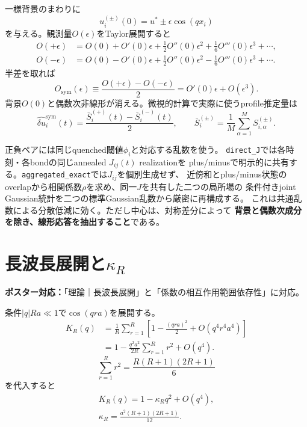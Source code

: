\documentclass[a4paper,12pt]{ltjsarticle}
\newcommand{\PosterMap}[1]{%
  \begin{tcolorbox}[enhanced,boxrule=0pt,arc=1mm,colback=softgray,
    left=2mm,right=2mm,top=1mm,bottom=1mm,before skip=0pt,after skip=0.7em]
  \normalsize\textbf{ポスター対応：}#1
  \end{tcolorbox}}
\begin{document}
一様背景のまわりに
\begin{equation}
 u_i^{(\pm)}(0)=u^*\pm\epsilon\cos(qx_i)
 \label{eq:paired-initial}
\end{equation}
を与える。観測量$O(\epsilon)$をTaylor展開すると
\begin{align}
 O(+\epsilon)&=O(0)+O'(0)\epsilon+\frac12O''(0)\epsilon^2
 +\frac16O'''(0)\epsilon^3+\cdots,\\
 O(-\epsilon)&=O(0)-O'(0)\epsilon+\frac12O''(0)\epsilon^2
 -\frac16O'''(0)\epsilon^3+\cdots.
\end{align}
半差を取れば
\begin{equation}
 \boxed{O_{\mathrm{sym}}(\epsilon)
 \equiv\frac{O(+\epsilon)-O(-\epsilon)}2
 =O'(0)\epsilon+O(\epsilon^3)}.
 \label{eq:symmetric-difference}
\end{equation}
背景$O(0)$と偶数次非線形が消える。微視的計算で実際に使うprofile推定量は
\begin{equation}
 \widehat{\delta u}_i^{\mathrm{sym}}(t)
 =\frac{\bar S_i^{(+)}(t)-\bar S_i^{(-)}(t)}2,
 \qquad
 \bar S_i^{(\pm)}=\frac1M\sum_{\alpha=1}^{M}S_{i,\alpha}^{(\pm)}.
 \label{eq:numerical-symmetric-response}
\end{equation}

正負ペアには同じquenched閾値$\phi_i$と対応する乱数を使う。
\texttt{direct\_J}では各時刻・各bondの同じannealed $J_{ij}(t)$ realizationを
plus/minusで明示的に共有する。\texttt{aggregated\_exact}では$J_{ij}$を個別生成せず、
近傍和とplus/minus状態のoverlapから相関係数$\rho$を求め、同一$J$を共有した二つの局所場の
条件付きjoint Gaussian統計を二つの標準Gaussian乱数から厳密に再構成する。
これは共通乱数による分散低減に効く。ただし中心は、対称差分によって
\textbf{背景と偶数次成分を除き、線形応答を抽出すること}である。

\section{長波長展開と\texorpdfstring{$\kappa_R$}{kappa-R}}\label{sec:kappa}
\PosterMap{「理論｜長波長展開」と「係数の相互作用範囲依存性」に対応。}

条件$|q|Ra\ll1$で$\cos(qra)$を展開する。
\begin{align}
 K_R(q)
 &=\frac1R\sum_{r=1}^{R}
 \left[1-\frac{(qra)^2}{2}+O(q^4r^4a^4)\right]\\
 &=1-\frac{q^2a^2}{2R}\sum_{r=1}^{R}r^2+O(q^4).
\end{align}
\begin{equation}
 \sum_{r=1}^{R}r^2=\frac{R(R+1)(2R+1)}6
\end{equation}
を代入すると
\begin{align}
 \boxed{K_R(q)=1-\kappa_Rq^2+O(q^4)},\label{eq:kernel-longwave}\\
 \boxed{\kappa_R=\frac{a^2(R+1)(2R+1)}{12}}.
 \label{eq:kappa-R}
\end{align}
\end{document}
